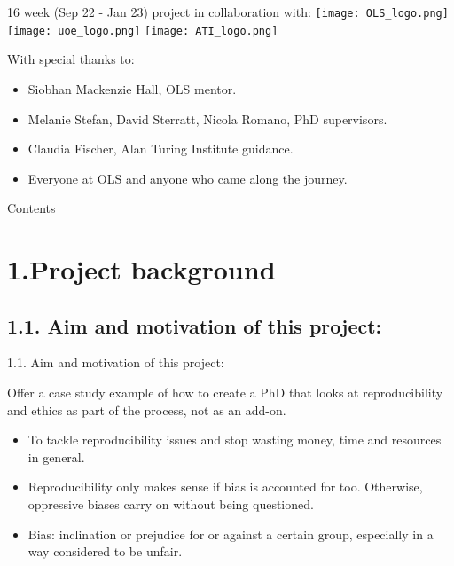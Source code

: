 \documentclass[t]{beamer}
\subtitle{Ethical standards and reproducibility of computer models in Neurobiology}
\date{19/01/2023}
\author{Susana Roman Garcia, PhD student.}
\begin{document}
\begin{frame}
	\titlepage
\end{frame}

\begin{frame}{16 week (Sep 22 - Jan 23) project in collaboration with:}
    \hfill \break
	\texttt{[image: OLS\_logo.png]}
        \texttt{[image: uoe\_logo.png]}
        \texttt{[image: ATI\_logo.png]}
\end{frame}

\begin{frame}{With special thanks to:}
    \begin{itemize}
        \item Siobhan Mackenzie Hall, OLS mentor.

        \item Melanie Stefan, David Sterratt, Nicola Romano, PhD supervisors.

        \item Claudia Fischer, Alan Turing Institute guidance.

        \item Everyone at OLS and anyone who came along the journey.
    \end{itemize}
\end{frame}

\begin{frame}{Contents}
	\tableofcontents
\end{frame}

\section{1.Project background}
\subsection{1.1. Aim and motivation of this project:}
\begin{frame}{1.1. Aim and motivation of this project:}
	\begin{block}{Offer a case study example of how to create a PhD that looks at reproducibility and ethics as part of the process, not as an add-on.}
        \hfill \break
  		\begin{itemize}    
  			\item To tackle reproducibility issues and stop wasting money, time and resources in general.
  			\item Reproducibility only makes sense if bias is accounted for too. Otherwise, oppressive biases carry on without being questioned.
                \item Bias: inclination or prejudice for or against a certain group, especially in a way considered to be unfair.
  		\end{itemize}    
	\end{block}
\end{frame}
\end{document}
